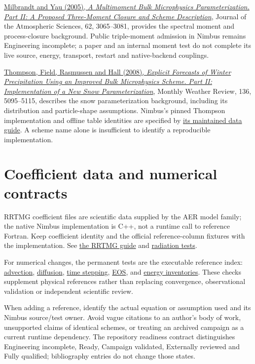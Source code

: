 \documentclass[
  11pt,
]{report}
\begin{document}
\href{https://www2.mmm.ucar.edu/wrf/users/physics/phys_refs/MICRO_PHYS/Milbrandt_Yau_part2.pdf}{Milbrandt
and Yau (2005), \emph{A Multimoment Bulk Microphysics Parameterization.
Part II: A Proposed Three-Moment Closure and Scheme Description}},
Journal of the Atmospheric Sciences, 62, 3065--3081, provides the
spectral moment and process-closure background. Public triple-moment
admission in Nimbus remains Engineering incomplete; a paper and an
internal moment test do not complete its live source, energy, transport,
restart and native-backend couplings.

\href{https://journals.ametsoc.org/abstract/journals/mwre/136/12/2008mwr2387.1.xml}{Thompson,
Field, Rasmussen and Hall (2008), \emph{Explicit Forecasts of Winter
Precipitation Using an Improved Bulk Microphysics Scheme. Part II:
Implementation of a New Snow Parameterization}}, Monthly Weather Review,
136, 5095--5115, describes the snow parameterization background,
including its distribution and particle-shape assumptions. Nimbus's
pinned Thompson implementation and offline table identities are
specified by \href{../src/microphysics/schemes/thompson/README.md}{its
maintained data guide}. A scheme name alone is insufficient to identify
a reproducible implementation.

\section{Coefficient data and numerical
contracts}\label{coefficient-data-and-numerical-contracts}

RRTMG coefficient files are scientific data supplied by the AER model
family; the native Nimbus implementation is C++, not a runtime call to
reference Fortran. Keep coefficient identity and the official
reference-column fixtures with the implementation. See
\href{../src/radiation/schemes/rrtmg/README.md}{the RRTMG guide} and
\href{../tests/physics/test_radiation.cpp}{radiation tests}.

For numerical changes, the permanent tests are the executable reference
index: \href{../tests/numerics/test_advection_cartesian.cpp}{advection},
\href{../tests/numerics/test_diffusion.cpp}{diffusion},
\href{../tests/numerics/test_time_stepping.cpp}{time stepping},
\href{../tests/core/test_eos_pressure.cpp}{EOS}, and
\href{../tests/diagnostics/test_energy_budget.cpp}{energy inventories}.
These checks supplement physical references rather than replacing
convergence, observational validation or independent scientific review.

When adding a reference, identify the actual equation or assumption used
and its Nimbus source/test owner. Avoid vague citations to an author's
body of work, unsupported claims of identical schemes, or treating an
archived campaign as a current runtime dependency. The repository
readiness contract distinguishes Engineering incomplete, Ready, Campaign
validated, Externally reviewed and Fully qualified; bibliography entries
do not change those states.
\end{document}
